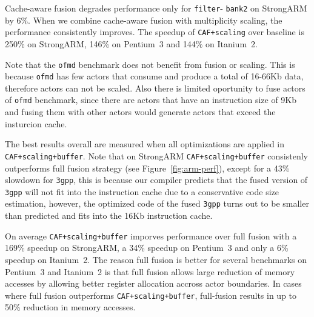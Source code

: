 


Cache-aware fusion degrades performance only for \texttt{filter}-
\texttt{bank2} on StrongARM by 6\%. When we combine cache-aware fusion 
with multiplicity scaling, the performance consistently improves. 
The speedup of \texttt{CAF+scaling} over baseline is 250\% on StrongARM,
146\% on Pentium~3 and 144\% on Itanium~2.




Note that the \texttt{ofmd} benchmark does not benefit from fusion or
scaling. This is because  \texttt{ofmd} has few actors that consume 
and produce a total of 16-66Kb data, therefore actors can not be scaled.
Also there is limited oportunity to fuse actors of \texttt{ofmd} 
benchmark, since there are actors that have an instruction size of 9Kb 
and fusing them with other actors would generate actors that exceed the
insturcion cache.




The best results overall are measured when all optimizations are
applied in \texttt{CAF+scaling+buffer}. Note that on StrongARM
\texttt{CAF+scaling+buffer} consistenly outperforms full fusion
strategy (see Figure~\ref{fig:arm-perf}), except for a 43\% slowdown 
for \texttt{3gpp}, this is because our compiler predicts that the
fused version of \texttt{3gpp} will not fit into the instruction cache 
due to a conservative code size estimation, however, the optimized code 
of the fused \texttt{3gpp} turns out to be smaller than predicted and 
fits into the 16Kb instruction cache.


On average \texttt{CAF+scaling+buffer} imporves performance over full 
fusion with a 169\% speedup on StrongARM, a 34\% speedup on Pentium~3 
and only a 6\% speedup on Itanium~2. The reason full fusion is better
for several benchmarks on Pentium~3 and Itanium~2 is that 
full fusion allows large reduction of memory accesses by allowing better 
register allocation accross actor boundaries. In cases where full fusion 
outperforms \texttt{CAF+scaling+buffer}, full-fusion results in up to 50\% 
reduction in memory accesses.


